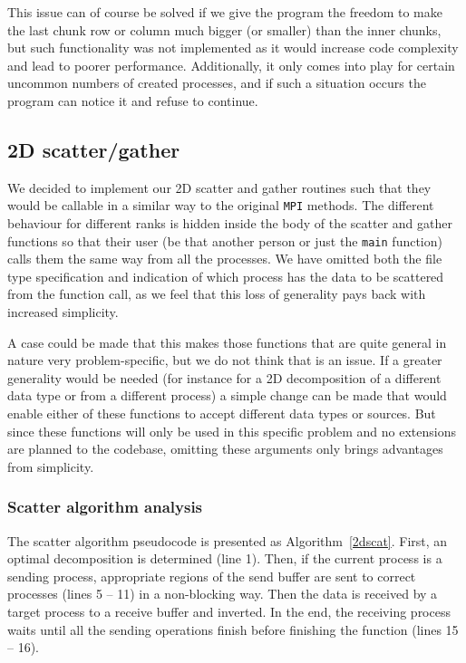\documentclass[11pt,a4paper]{article}
\begin{document}
This issue can of course be solved if we give the program the freedom to make the last chunk row or column much bigger (or smaller) than the inner chunks, but such functionality was not implemented as it would increase code complexity and lead to poorer performance. 
Additionally, it only comes into play for certain uncommon numbers of created processes, and if such a situation occurs the program can notice it and refuse to continue.

\subsection{2D scatter/gather}
\label{sec:2dscatgat}
We decided to implement our 2D scatter and gather routines such that they would be callable in a similar way to the original \texttt{MPI} methods. 
The different behaviour for different ranks is hidden inside the body of the scatter and gather functions so that their user (be that another person or just the \texttt{main} function) calls them the same way from all the processes. 
We have omitted both the file type specification and indication of which process has the data to be scattered from the function call, as we feel that this loss of generality pays back with increased simplicity. 

A case could be made that this makes those functions that are quite general in nature very problem-specific, but we do not think that is an issue. 
If a greater generality would be needed (for instance for a 2D decomposition of a different data type or from a different process) a simple change can be made that would enable either of these functions to accept different data types or sources. 
But since these functions will only be used in this specific problem and no extensions are planned to the codebase, omitting these arguments only brings advantages from simplicity.

\subsubsection{Scatter algorithm analysis}
The scatter algorithm pseudocode is presented as Algorithm~\ref{2dscat}. 
First, an optimal decomposition is determined (line 1). 
Then, if the current process is a sending process, appropriate regions of the send buffer are sent to correct processes (lines 5 -- 11) in a non-blocking way. 
Then the data is received by a target process to a receive buffer and inverted. In the end, the receiving process waits until all the sending operations finish before finishing the function (lines 15 -- 16).
\end{document}
